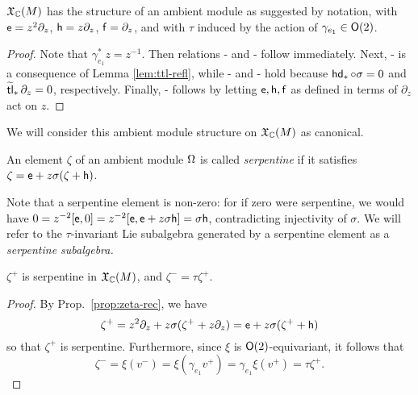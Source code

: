 \begin{lem}\label{lem:snake-ambient}
       $\mathfrak{X}_{{\mathbb{C}}}(M)$ has the structure of an ambient module as suggested
by notation, with $\mathsf{e}=z^2\partial_z$, $\mathsf{h}=z\partial_z$, $\mathsf{f}=\partial_z$, and with $\tau$ induced by the
action of $\gamma_{e_1} \in \mathsf{O}(2)$.
\end{lem}
\begin{proof}
        Note that $\gamma_{e_1}^* z = z^{-1}$. 
        Then relations \flip-\sltwo{} and \flip-\twist{}
        follow immediately. Next, \flip-\shift{} is a consequence of Lemma \ref{lem:ttl-refl}, while
        \shift-\twist{} and \shift-\sltwo{} hold because $\operatorname{\mathsf{hd}}_* \circ\sigma=0$ and $\operatorname{\widetilde{\operatorname{\mathsf{tl}}}}_*\partial_z = 0$,
        respectively. Finally, \twist-\sltwo{} follows by letting $\mathsf{e},\mathsf{h},\mathsf{f}$ as defined in terms
of $\partial_z$ act on $z$.
\end{proof}

We will consider this ambient module structure on $\mathfrak{X}_{{\mathbb{C}}}(M)$ as canonical.

\begin{defn}\label{defn:serpentine}
        An element $\zeta$ of an ambient module $\Omega$ is called \emph{serpentine}
if it satisfies $\zeta = \mathsf{e} + z \sigma (\zeta + \mathsf{h})$.
\end{defn}

Note that a serpentine element is non-zero: for if zero were serpentine,
we would have $0=z^{-2}[\mathsf{e},0]=z^{-2}[\mathsf{e},\mathsf{e}+z\sigma\mathsf{h}]=\sigma\mathsf{h}$, contradicting injectivity of $\sigma$. 
We will refer to the $\tau$-invariant Lie subalgebra generated by a serpentine element
as a \emph{serpentine subalgebra.}

\begin{lem}\label{lem:snake-serpentine}
        $\zeta^+$ is serpentine in $\mathfrak{X}_{{\mathbb{C}}}(M)$, and $\zeta^-=\tau\zeta^+$.
\end{lem}

\begin{proof}
        By Prop.~\ref{prop:zeta-rec}, we have
\[
        \zeta^+ = z^2 \partial_z + z \sigma (\zeta^+ + z \partial_z) = \mathsf{e} + z \sigma (\zeta^+ + \mathsf{h})
\]
so that $\zeta^+$ is serpentine. Furthermore, since $\xi$ is $\mathsf{O}(2)$-equivariant,
it follows that
\[
        \zeta^- = \xi(v^-) = \xi(\gamma_{e_1}v^+) = \gamma_{e_1}\xi(v^+) = \tau\zeta^+.     
\]
\end{proof}

